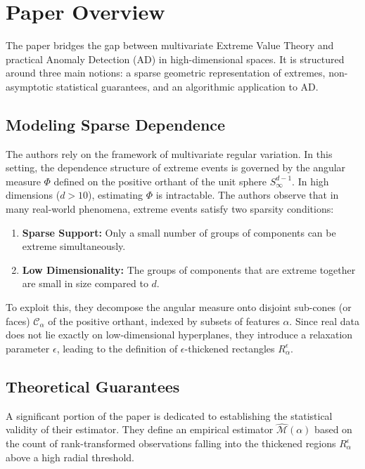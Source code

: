 \documentclass[11pt]{article}
\begin{document}
\section{Paper Overview}
The paper bridges the gap between multivariate Extreme Value Theory and practical Anomaly Detection (AD) in high-dimensional spaces. It is structured around three main notions: a sparse geometric representation of extremes, non-asymptotic statistical guarantees, and an algorithmic application to AD.

\subsection{Modeling Sparse Dependence}
The authors rely on the framework of multivariate regular variation. In this setting, the dependence structure of extreme events is governed by the angular measure $\Phi$ defined on the positive orthant of the unit sphere $S_\infty^{d-1}$. In high dimensions ($d > 10$), estimating $\Phi$ is intractable. The authors observe that in many real-world phenomena, extreme events satisfy two sparsity conditions:
\begin{enumerate}
    \item \textbf{Sparse Support:} Only a small number of groups of components can be extreme simultaneously.
    \item \textbf{Low Dimensionality:} The groups of components that are extreme together are small in size compared to $d$.
\end{enumerate}
To exploit this, they decompose the angular measure onto disjoint sub-cones (or faces) $\mathcal{C}_\alpha$ of the positive orthant, indexed by subsets of features $\alpha$. Since real data does not lie exactly on low-dimensional hyperplanes, they introduce a relaxation parameter $\epsilon$, leading to the definition of $\epsilon$-thickened rectangles $R_\alpha^\epsilon$.

\subsection{Theoretical Guarantees}
A significant portion of the paper is dedicated to establishing the statistical validity of their estimator. They define an empirical estimator $\widehat{\mathcal{M}}(\alpha)$ based on the count of rank-transformed observations falling into the thickened regions $R_\alpha^\epsilon$ above a high radial threshold.
\end{document}
